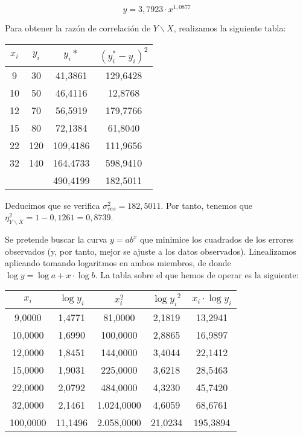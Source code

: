 $$y=3,7923·x^{1,0877}$$

Para obtener la razón de correlación de $Y\backslash X$, realizamos la siguiente tabla:

\begin{center}
	\begin{tabular}{|c|c|c|c|}
	\hline
$x_i$ & $y_i$ & $y_i*$ & $(y_i^*-y_i)^2$ \\ \hline
9 & 30 & 41,3861 & 129,6428 \\ 
10 & 50 & 46,4116 & 12,8768 \\ 
12 & 70 & 56,5919 & 179,7766 \\ 
15 & 80 & 72,1384 & 61,8040 \\ 
22 & 120 & 109,4186 & 111,9656 \\ 
32 & 140 & 164,4733 & 598,9410 \\ \hline
 & & 490,4199 & 182,5011 \\ \hline
\end{tabular}
\end{center}

Deducimos que se verifica $\sigma_{res}^2 = 182,5011$. Por tanto, tenemos que $\eta_{Y\backslash X}^2 = 1 - 0,1261 = 0,8739$.

\subproblem

Se pretende buscar la curva $y =  ab^x$ que minimice los cuadrados de los errores observados (y, por tanto, mejor se ajuste a los datos observados). Linealizamos aplicando tomando logaritmos en ambos miembros, de donde $\log{y} = \log{a} + x·\log{b}$. La tabla sobre el que hemos de operar es la siguiente:

\begin{center}
	\begin{tabular}{ c|c|c c c }
	
	$x_i$ & $\log{y_i}$ & $x_i^2$ & $\log{y_i}^2$ & $x_i·\log{y_i}$ \\ \hline
	9,0000 & 1,4771 & 81,0000 & 2,1819 & 13,2941 \\ 
	10,0000 & 1,6990 & 100,0000 & 2,8865 & 16,9897 \\ 
	12,0000 & 1,8451 & 144,0000 & 3,4044 & 22,1412 \\ 
	15,0000 & 1,9031 & 225,0000 & 3,6218 & 28,5463 \\ 
	22,0000 & 2,0792 & 484,0000 & 4,3230 & 45,7420 \\ 
	32,0000 & 2,1461 & 1.024,0000 & 4,6059 & 68,6761 \\ \hline
	100,0000 & 11,1496 & 2.058,0000 & 21,0234 & 195,3894 \\ 
\end{tabular}
\end{center}


